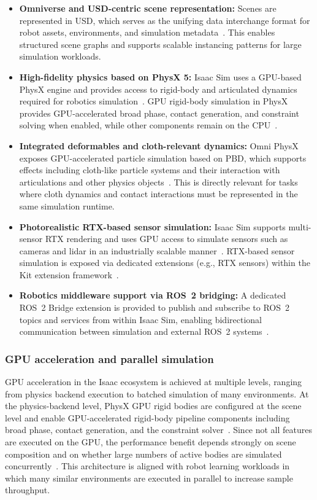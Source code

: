 \begin{itemize}
    \item \textbf{Omniverse and \ac{USD}-centric scene representation:} Scenes are represented in \ac{USD}, which serves as the unifying data interchange format for robot assets, environments, and simulation metadata~\cite{nvidia_isaac_sim_510_what_is}. This enables structured scene graphs and supports scalable instancing patterns for large simulation workloads.
    \item \textbf{High-fidelity physics based on PhysX 5:} Isaac Sim uses a GPU-based PhysX engine and provides access to rigid-body and articulated dynamics required for robotics simulation~\cite{nvidia_isaac_sim_510_what_is}. GPU rigid-body simulation in PhysX provides GPU-accelerated broad phase, contact generation, and constraint solving when enabled, while other components remain on the CPU~\cite{physx_gpu_rigid_bodies_510}.
    \item \textbf{Integrated deformables and cloth-relevant dynamics:} Omni PhysX exposes GPU-accelerated particle simulation based on \ac{PBD}, which supports effects including cloth-like particle systems and their interaction with articulations and other physics objects~\cite{omni_physics_particles}. This is directly relevant for tasks where cloth dynamics and contact interactions must be represented in the same simulation runtime.
    \item \textbf{Photorealistic RTX-based sensor simulation:} Isaac Sim supports multi-sensor RTX rendering and uses GPU access to simulate sensors such as cameras and lidar in an industrially scalable manner~\cite{nvidia_isaac_sim_510_what_is}. RTX-based sensor simulation is exposed via dedicated extensions (e.g., RTX sensors) within the Kit extension framework~\cite{nvidia_isaac_sim_510_extensions_api}.
    \item \textbf{Robotics middleware support via \ac{ROS}~2 bridging:} A dedicated \ac{ROS}~2 Bridge extension is provided to publish and subscribe to \ac{ROS}~2 topics and services from within Isaac Sim, enabling bidirectional communication between simulation and external \ac{ROS}~2 systems~\cite{nvidia_isaac_sim_510_extensions_api}.
\end{itemize}

\subsubsection{GPU acceleration and parallel simulation}
GPU acceleration in the Isaac ecosystem is achieved at multiple levels, ranging from physics backend execution to batched simulation of many environments. At the physics-backend level, PhysX GPU rigid bodies are configured at the scene level and enable GPU-accelerated rigid-body pipeline components including broad phase, contact generation, and the constraint solver~\cite{physx_gpu_rigid_bodies_510}. Since not all features are executed on the GPU, the performance benefit depends strongly on scene composition and on whether large numbers of active bodies are simulated concurrently~\cite{physx_gpu_rigid_bodies_510}. This architecture is aligned with robot learning workloads in which many similar environments are executed in parallel to increase sample throughput.

